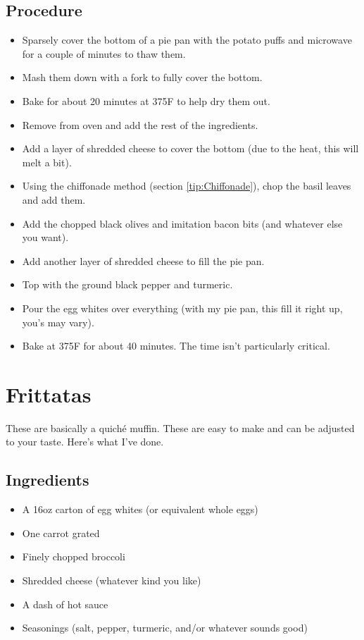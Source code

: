 \documentclass[10pt, openany]{book}
\begin{document}
\subsection{Procedure}
\begin{itemize}
  \item Sparsely cover the bottom of a pie pan with the potato puffs and microwave for a couple of minutes to thaw them.
  \item Mash them down with a fork to fully cover the bottom.
  \item Bake for about 20 minutes at 375\degree{}F to help dry them out.
  \item Remove from oven and add the rest of the ingredients.
  \item Add a layer of shredded cheese to cover the bottom (due to the heat, this will melt a bit).
  \item Using the chiffonade method (section \ref{tip:Chiffonade}), chop the basil leaves and add them.
  \item Add the chopped black olives and imitation bacon bits (and whatever else you want).
  \item Add another layer of shredded cheese to fill the pie pan.
  \item Top with the ground black pepper and turmeric.
  \item Pour the egg whites over everything (with my pie pan, this fill it right up, you's may vary).
  \item Bake at 375\degree{}F for about 40 minutes.  The time isn't particularly critical.
\end{itemize}

\section{Frittatas}
These are basically a quich\'e muffin.  These are easy to make and can be adjusted to your taste.  Here's what I've done.
\subsection{Ingredients}
\begin{itemize}
  \item A 16oz carton of egg whites (or equivalent whole eggs)
  \item One carrot grated
  \item Finely chopped broccoli
  \item Shredded cheese (whatever kind you like)
  \item A dash of hot sauce
  \item Seasonings (salt, pepper, turmeric, and/or whatever sounds good)
\end{itemize}
\end{document}
